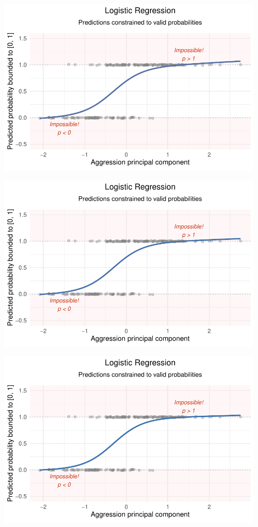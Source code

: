 \documentclass[
  letterpaper,
  DIV=11,
  numbers=noendperiod]{scrartcl}
\begin{document}
\begin{center}
\includegraphics[width=0.8\linewidth,height=\textheight,keepaspectratio]{Beyond!!!_files/figure-pdf/unnamed-chunk-4-42.pdf}
\end{center}

\begin{center}
\includegraphics[width=0.8\linewidth,height=\textheight,keepaspectratio]{Beyond!!!_files/figure-pdf/unnamed-chunk-4-43.pdf}
\end{center}

\begin{center}
\includegraphics[width=0.8\linewidth,height=\textheight,keepaspectratio]{Beyond!!!_files/figure-pdf/unnamed-chunk-4-44.pdf}
\end{center}
\end{document}
